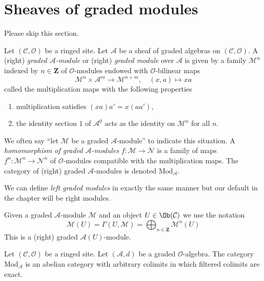 \section{Sheaves of graded modules}
\label{section-graded-modules}

\noindent
Please skip this section.

\begin{definition}
\label{definition-gm}
Let $(\mathcal{C}, \mathcal{O})$ be a ringed site.
Let $\mathcal{A}$ be a sheaf of graded algebras
on $(\mathcal{C}, \mathcal{O})$.
A (right) {\it graded $\mathcal{A}$-module} or (right)
{\it graded module} over $\mathcal{A}$
is given by a family $\mathcal{M}^n$ indexed by $n \in \mathbf{Z}$
of $\mathcal{O}$-modules endowed with
$\mathcal{O}$-bilinear maps
$$
\mathcal{M}^n \times \mathcal{A}^m \to \mathcal{M}^{n + m},\quad
(x, a) \longmapsto xa
$$
called the multiplication maps with the following properties
\begin{enumerate}
\item multiplication satisfies $(xa)a' = x(aa')$,
\item the identity section $1$ of $\mathcal{A}^0$
acts as the identity on $\mathcal{M}^n$ for all $n$.
\end{enumerate}
We often say ``let $\mathcal{M}$ be a graded $\mathcal{A}$-module''
to indicate this situation.
A {\it homomorphism of graded $\mathcal{A}$-modules}
$f : \mathcal{M} \to \mathcal{N}$ is a family of maps
$f^n : \mathcal{M}^n \to \mathcal{N}^n$
of $\mathcal{O}$-modules compatible with the multiplication maps.
The category of (right) graded $\mathcal{A}$-modules
is denoted $\text{Mod}_\mathcal{A}$.
\end{definition}

\noindent
We can define {\it left graded modules} in exactly the same manner
but our default in the chapter will be right modules.

\medskip\noindent
Given a graded $\mathcal{A}$-module $\mathcal{M}$
and an object $U \in \Ob(\mathcal{C})$ we use the notation
$$
\mathcal{M}(U) =
\Gamma(U, \mathcal{M}) =
\bigoplus\nolimits_{n \in \mathbf{Z}} \mathcal{M}^n(U)
$$
This is a (right) graded $\mathcal{A}(U)$-module.

\begin{lemma}
\label{lemma-gm-abelian}
Let $(\mathcal{C}, \mathcal{O})$ be a ringed site.
Let $(\mathcal{A}, d)$ be a graded $\mathcal{O}$-algebra.
The category $\text{Mod}_\mathcal{A}$ is an abelian category
with arbitrary colimits in which filtered colimits are exact.
\end{lemma}

